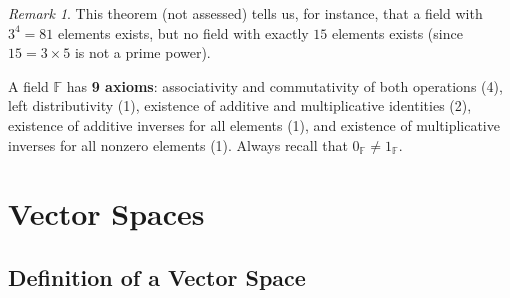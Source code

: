 \documentclass[11pt, a4paper, notitlepage]{report}
\theoremstyle{definition}
\theoremstyle{remark}
\newtheorem{remark}[theorem]{Remark}
\begin{document}
\begin{remark}
This theorem (not assessed) tells us, for instance, that a field with $3^4 = 81$ elements exists, but no field with exactly $15$ elements exists (since $15 = 3 \times 5$ is not a prime power).
\end{remark}

\begin{keyresult}[title={Key Result: Field Axioms Summary}]
A field $\mathbb{F}$ has \textbf{9 axioms}: associativity and commutativity of both operations (4), left distributivity (1), existence of additive and multiplicative identities (2), existence of additive inverses for all elements (1), and existence of multiplicative inverses for all nonzero elements (1). Always recall that $0_\mathbb{F} \neq 1_\mathbb{F}$.
\end{keyresult}

\section{Vector Spaces}
\label{sec:vector-spaces}

\subsection{Definition of a Vector Space}
\end{document}
